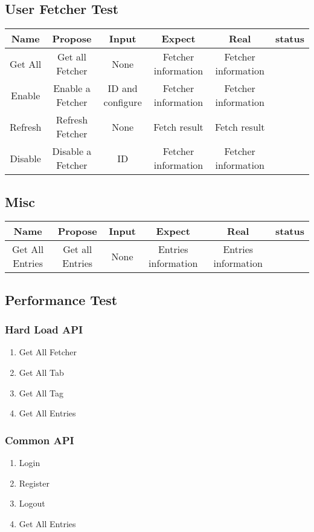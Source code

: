   \subsection{User Fetcher Test}
    \begin{tabular}{c|c|c|c|c|c}
      \hline
      Name & Propose & Input & Expect & Real & status \\ \hline
      Get All & Get all Fetcher & None & Fetcher information & Fetcher information & \\ \hline
      Enable & Enable a Fetcher & ID and configure & Fetcher information & Fetcher information & \\ \hline
      Refresh & Refresh Fetcher & None & Fetch result & Fetch result & \\ \hline
      Disable & Disable a Fetcher & ID & Fetcher information & Fetcher information & \\ \hline
    \end{tabular}
  \subsection{Misc}
    \begin{tabular}{c|c|c|c|c|c}
      \hline
      Name & Propose & Input & Expect & Real & status \\ \hline
      Get All Entries & Get all Entries & None & Entries information & Entries information & \\ \hline
    \end{tabular}
  \subsection{Performance Test}
    \subsubsection{Hard Load API}
      \begin{enumerate}
        \item Get All Fetcher
        \item Get All Tab
        \item Get All Tag
        \item Get All Entries
      \end{enumerate}
    \subsubsection{Common API}
      \begin{enumerate}
        \item Login
        \item Register
        \item Logout
        \item Get All Entries
      \end{enumerate}

